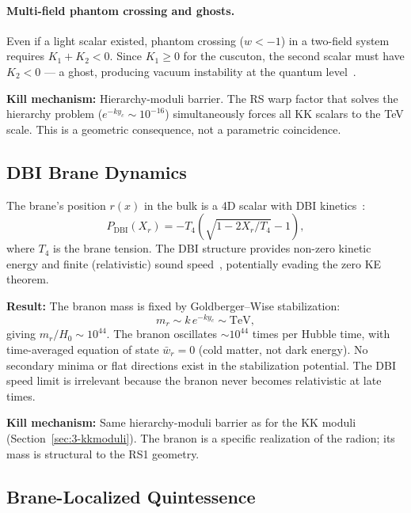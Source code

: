 \paragraph{Multi-field phantom crossing and ghosts.} Even if a light scalar existed, phantom crossing ($w < -1$) in a two-field system requires $K_1 + K_2 < 0$. Since $K_1 \geq 0$ for the cuscuton, the second scalar must have $K_2 < 0$ --- a ghost, producing vacuum instability at the quantum level~\cite{ch3:woodard2006}.

\textbf{Kill mechanism:} Hierarchy-moduli barrier. The RS warp factor that solves the hierarchy problem ($e^{-ky_c} \sim 10^{-16}$) simultaneously forces all KK scalars to the TeV scale. This is a geometric consequence, not a parametric coincidence.

\subsection{DBI Brane Dynamics}
\label{sec:3-dbi}

The brane's position $r(x)$ in the bulk is a 4D scalar with DBI kinetics~\cite{ch3:gibbons2002}:
\begin{equation}
  P_{\mathrm{DBI}}(X_r) = -T_4\!\left(\sqrt{1 - 2X_r/T_4} - 1\right),
  \label{eq:3-19}
\end{equation}
where $T_4$ is the brane tension. The DBI structure provides non-zero kinetic energy and finite (relativistic) sound speed~\cite{ch3:kessence2000}, potentially evading the zero KE theorem.

\textbf{Result:} The branon mass is fixed by Goldberger--Wise stabilization:
\begin{equation}
  m_r \sim k\,e^{-ky_c} \sim \mathrm{TeV},
  \label{eq:3-20}
\end{equation}
giving $m_r / H_0 \sim 10^{44}$. The branon oscillates ${\sim}10^{44}$ times per Hubble time, with time-averaged equation of state $\bar{w}_r = 0$ (cold matter, not dark energy). No secondary minima or flat directions exist in the stabilization potential. The DBI speed limit is irrelevant because the branon never becomes relativistic at late times.

\textbf{Kill mechanism:} Same hierarchy-moduli barrier as for the KK moduli (Section~\ref{sec:3-kkmoduli}). The branon is a specific realization of the radion; its mass is structural to the RS1 geometry.

\subsection{Brane-Localized Quintessence}
\label{sec:3-branequintessence}

